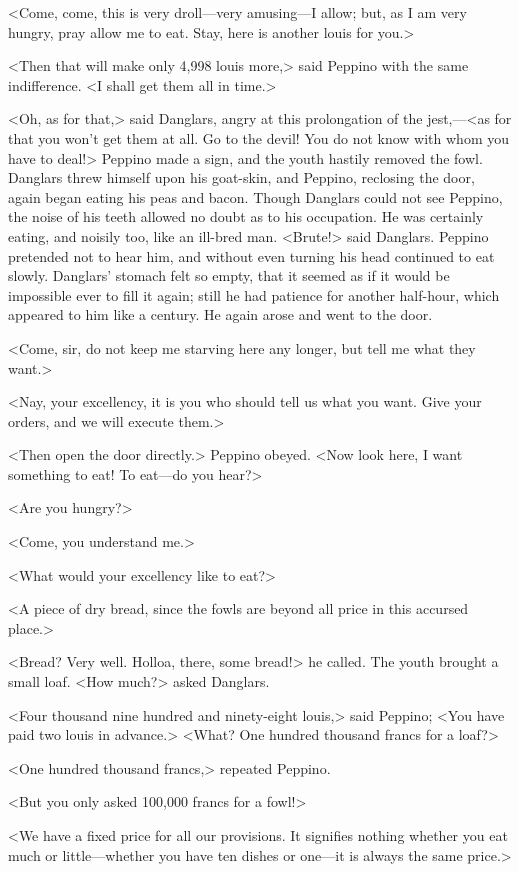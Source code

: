 <Come, come, this is very droll—very amusing—I allow; but, as I am very hungry, pray allow me to eat. Stay, here is another louis for you.> 

 <Then that will make only 4,998 louis more,> said Peppino with the same indifference. <I shall get them all in time.> 

 <Oh, as for that,> said Danglars, angry at this prolongation of the jest,—<as for that you won't get them at all. Go to the devil! You do not know with whom you have to deal!>  Peppino made a sign, and the youth hastily removed the fowl. Danglars threw himself upon his goat-skin, and Peppino, reclosing the door, again began eating his peas and bacon. Though Danglars could not see Peppino, the noise of his teeth allowed no doubt as to his occupation. He was certainly eating, and noisily too, like an ill-bred man. <Brute!> said Danglars. Peppino pretended not to hear him, and without even turning his head continued to eat slowly. Danglars' stomach felt so empty, that it seemed as if it would be impossible ever to fill it again; still he had patience for another half-hour, which appeared to him like a century. He again arose and went to the door. 

 <Come, sir, do not keep me starving here any longer, but tell me what they want.> 

 <Nay, your excellency, it is you who should tell us what you want. Give your orders, and we will execute them.> 

 <Then open the door directly.> Peppino obeyed. <Now look here, I want something to eat! To eat—do you hear?> 

 <Are you hungry?> 

 <Come, you understand me.> 

 <What would your excellency like to eat?> 

 <A piece of dry bread, since the fowls are beyond all price in this accursed place.> 

 <Bread? Very well. Holloa, there, some bread!> he called. The youth brought a small loaf. <How much?> asked Danglars. 

 <Four thousand nine hundred and ninety-eight louis,> said Peppino; <You have paid two louis in advance.>  <What? One hundred thousand francs for a loaf?> 

 <One hundred thousand francs,> repeated Peppino. 

 <But you only asked 100,000 francs for a fowl!> 

 <We have a fixed price for all our provisions. It signifies nothing whether you eat much or little—whether you have ten dishes or one—it is always the same price.> 

